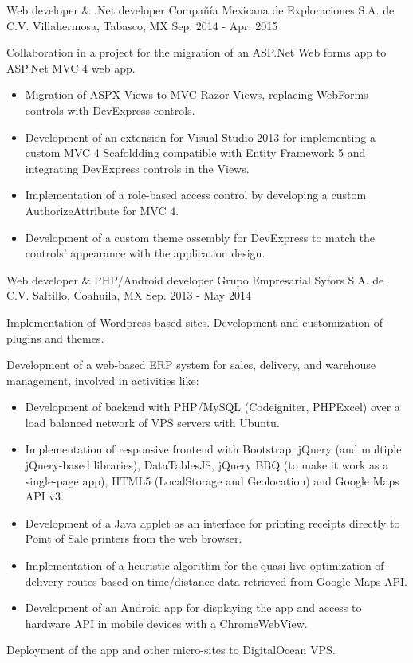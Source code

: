 \begin{cventries}
\cventry
{Web developer \& .Net developer} %
{Compañía Mexicana de Exploraciones S.A. de C.V.} %
{Villahermosa, Tabasco, MX} %
{Sep. 2014 - Apr. 2015} %
{ %
	\begin{cvitems}
		\item {Collaboration in a project for the migration of an ASP.Net Web forms app to ASP.Net MVC 4 web app.}
		\begin{itemize}
			\item {Migration of ASPX Views to MVC Razor Views, replacing WebForms controls with DevExpress controls.}
			\item {Development of an extension for Visual Studio 2013 for implementing a custom MVC 4 Scafoldding compatible with Entity Framework 5 and integrating DevExpress controls in the Views.}
			\item {Implementation of a role-based access control by developing a custom AuthorizeAttribute for MVC 4. }
			\item {Development of a custom theme assembly for DevExpress to match the controls' appearance with the application design.}
		\end{itemize}
	\end{cvitems}
}


\cventry
{Web developer \& PHP/Android developer} %
{Grupo Empresarial Syfors S.A. de C.V.} %
{Saltillo, Coahuila, MX} %
{Sep. 2013 - May 2014} %
{ %
	\begin{cvitems}
		\item {Implementation of Wordpress-based sites. Development and customization of plugins and themes.}
		\item {Development of a web-based ERP system for sales, delivery, and warehouse management, involved in activities like:}
		\begin{itemize}
			\item {Development of backend with PHP/MySQL (Codeigniter, PHPExcel) over a load balanced network of VPS servers with Ubuntu.}
			\item {Implementation of responsive frontend with Bootstrap, jQuery (and multiple jQuery-based libraries), DataTablesJS, jQuery BBQ (to make it work as a single-page app), HTML5 (LocalStorage and Geolocation) and Google Maps API v3.}
			\item {Development of a Java applet as an interface for printing receipts directly to Point of Sale printers from the web browser.}
			\item {Implementation of a heuristic algorithm for the quasi-live optimization of delivery routes based on time/distance data retrieved from Google Maps API.}
			\item {Development of an Android app for displaying the app and access to hardware API in mobile devices with a ChromeWebView.}
		\end{itemize}
		\item {Deployment of the app and other micro-sites to DigitalOcean VPS.}
	\end{cvitems} 
}


\end{cventries}